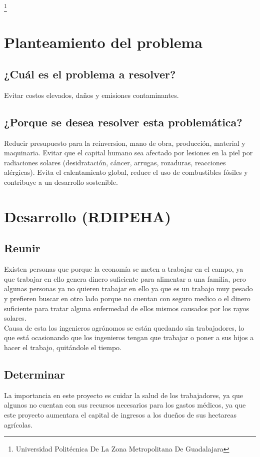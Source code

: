 \documentclass[11pt,a4paper]{article}
\begin{document}
\footnote{Universidad Politécnica De La Zona Metropolitana De Guadalajara} 

\pagebreak

\section{Planteamiento del problema}
\subsection{¿Cuál es el problema a resolver?}
Evitar costos elevados, daños y emisiones contaminantes.\\
\subsection{¿Porque se desea resolver esta problemática?}
Reducir presupuesto para la reinversion, mano de obra, producción, material y maquinaria. Evitar que el capital humano sea afectado por lesiones en la piel por radiaciones solares (desidratación, cáncer, arrugas, rozaduras, reacciones alérgicas). Evita el calentamiento global, reduce el uso de combustibles fósiles y contribuye a un desarrollo sostenible.
\section{Desarrollo (RDIPEHA)} 
\subsection{Reunir}
Existen personas que porque la economía se meten a trabajar en el campo, ya que trabajar en ello genera dinero suficiente para alimentar a una familia, pero algunas personas ya no quieren trabajar en ello ya que es un trabajo muy pesado y prefieren buscar en otro lado porque no cuentan con seguro medico o el dinero suficiente para tratar alguna enfermedad de ellos mismos causados por los rayos solares.\\
Causa de esta los ingenieros agrónomos se están quedando sin trabajadores, lo que está ocasionando que los ingenieros tengan que trabajar o poner a sus hijos a hacer el trabajo, quitándole el tiempo.
\subsection{Determinar}
La importancia en este proyecto es cuidar la salud de los trabajadores, ya que algunos no cuentan con sus recursos necesarios para los gastos médicos, ya que este proyecto aumentara el capital de ingresos a los dueños de sus hectareas agrícolas.
\end{document}
